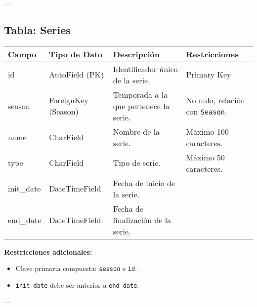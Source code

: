 \documentclass{report}
\begin{document}
    ---
    
    \subsection*{Tabla: Series}
    \begin{tabular}{|>{\raggedright\arraybackslash}p{3cm}|>{\raggedright\arraybackslash}p{3cm}|>{\raggedright\arraybackslash}p{6cm}|>{\raggedright\arraybackslash}p{4cm}|}
        \hline
        \textbf{Campo} & \textbf{Tipo de Dato} & \textbf{Descripción} & \textbf{Restricciones} \\
        \hline
        id & AutoField (PK) & Identificador único de la serie. & Primary Key \\
        \hline
        season & ForeignKey (Season) & Temporada a la que pertenece la serie. & No nulo, relación con \texttt{Season}. \\
        \hline
        name & CharField & Nombre de la serie. & Máximo 100 caracteres. \\
        \hline
        type & CharField & Tipo de serie. & Máximo 50 caracteres. \\
        \hline
        init\_date & DateTimeField & Fecha de inicio de la serie. &  \\
        \hline
        end\_date & DateTimeField & Fecha de finalización de la serie. &  \\
        \hline
    \end{tabular}
    
    \textbf{Restricciones adicionales:}
    \begin{itemize}
        \item Clave primaria compuesta: \texttt{season} e \texttt{id}.
        \item \texttt{init\_date} debe ser anterior a \texttt{end\_date}.
    \end{itemize}
    
    ---
    
\end{document}
